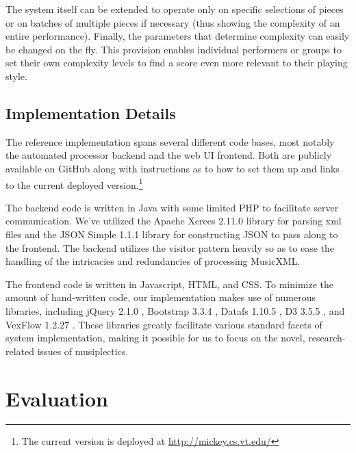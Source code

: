 \documentclass[12pt]{report}
\begin{document}
The system itself can be extended to operate only on specific selections of pieces or on batches of multiple pieces if necessary (thus showing the complexity of an entire performance). Finally, the parameters that determine complexity can easily be changed on the fly. This provision enables individual performers or groups to set their own complexity levels to find a score even more relevant to their playing style.



\section{Implementation Details} 
\label{sec:details}

The reference implementation spans several different code bases, most notably the automated processor backend and the web UI frontend. Both are publicly available on GitHub \cite{GithubMusicScoring} along with instructions as to how to set them up and links to the current deployed version.\footnote{The current version is deployed at \url{http://mickey.cs.vt.edu/}}

The backend code is written in Java with some limited PHP to facilitate server communication. We've utilized the Apache Xerces 2.11.0 library for parsing xml files \cite{XMLAPI} and the JSON Simple 1.1.1 library \cite{JSONAPI} for constructing JSON to pass along to the frontend. The backend utilizes the visitor pattern heavily so as to ease the handling of the intricacies and redundancies of processing MusicXML.

The frontend code is written in Javascript, HTML, and CSS. To minimize the amount of hand-written code, our implementation makes use of numerous libraries, including jQuery 2.1.0 \cite{jQuery}, Bootstrap 3.3.4 \cite{Bootstrap}, Datafs 1.10.5 \cite{DataTables}, D3 3.5.5 \cite{D3}, and VexFlow 1.2.27 \cite{VexFlow}. These libraries greatly facilitate various standard facets of system implementation, making it possible for us to focus on the novel, research-related issues of musiplectics.

\chapter{Evaluation} 
\label{sec:eval}
\end{document}
